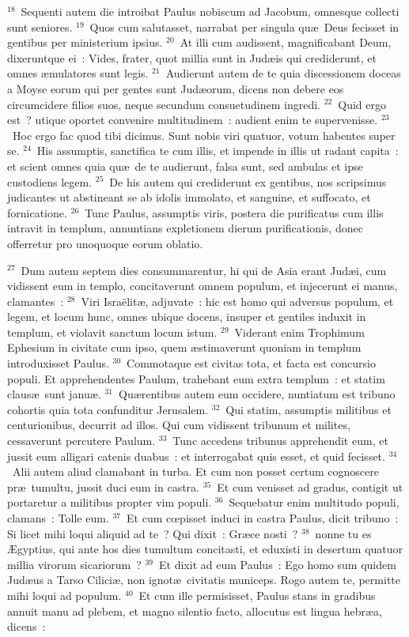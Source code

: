 ${}^{18}$~Sequenti autem die introibat Paulus nobiscum ad Jacobum, omnesque collecti sunt seniores.
${}^{19}$~Quos cum salutasset, narrabat per singula qu\ae\ Deus fecisset in gentibus per ministerium ipsius.
${}^{20}$~At illi cum audissent, magnificabant Deum, dixeruntque ei~: Vides, frater, quot millia sunt in Jud\ae is qui crediderunt, et omnes \ae mulatores sunt legis.
${}^{21}$~Audierunt autem de te quia discessionem doceas a Moyse eorum qui per gentes sunt Jud\ae orum, dicens non debere eos circumcidere filios suos, neque secundum consuetudinem ingredi.
${}^{22}$~Quid ergo est~? utique oportet convenire multitudinem~: audient enim te supervenisse.
${}^{23}$~Hoc ergo fac quod tibi dicimus. Sunt nobis viri quatuor, votum habentes super se.
${}^{24}$~His assumptis, sanctifica te cum illis, et impende in illis ut radant capita~: et scient omnes quia qu\ae\ de te audierunt, falsa sunt, sed ambulas et ipse custodiens legem.
${}^{25}$~De his autem qui crediderunt ex gentibus, nos scripsimus judicantes ut abstineant se ab idolis immolato, et sanguine, et suffocato, et fornicatione.
${}^{26}$~Tunc Paulus, assumptis viris, postera die purificatus cum illis intravit in templum, annuntians expletionem dierum purificationis, donec offerretur pro unoquoque eorum oblatio.


${}^{27}$~Dum autem septem dies consummarentur, hi qui de Asia erant Jud\ae i, cum vidissent eum in templo, concitaverunt omnem populum, et injecerunt ei manus, clamantes~:
${}^{28}$~Viri Isra\"elit\ae , adjuvate~: hic est homo qui adversus populum, et legem, et locum hunc, omnes ubique docens, insuper et gentiles induxit in templum, et violavit sanctum locum istum.
${}^{29}$~Viderant enim Trophimum Ephesium in civitate cum ipso, quem \ae stimaverunt quoniam in templum introduxisset Paulus.
${}^{30}$~Commotaque est civitas tota, et facta est concursio populi. Et apprehendentes Paulum, trahebant eum extra templum~: et statim claus\ae\ sunt janu\ae .
${}^{31}$~Qu\ae rentibus autem eum occidere, nuntiatum est tribuno cohortis quia tota confunditur Jerusalem.
${}^{32}$~Qui statim, assumptis militibus et centurionibus, decurrit ad illos. Qui cum vidissent tribunum et milites, cessaverunt percutere Paulum.
${}^{33}$~Tunc accedens tribunus apprehendit eum, et jussit eum alligari catenis duabus~: et interrogabat quis esset, et quid fecisset.
${}^{34}$~Alii autem aliud clamabant in turba. Et cum non posset certum cognoscere pr\ae\ tumultu, jussit duci eum in castra.
${}^{35}$~Et cum venisset ad gradus, contigit ut portaretur a militibus propter vim populi.
${}^{36}$~Sequebatur enim multitudo populi, clamans~: Tolle eum.
${}^{37}$~Et cum cœpisset induci in castra Paulus, dicit tribuno~: Si licet mihi loqui aliquid ad te~? Qui dixit~: Gr\ae ce nosti~?
${}^{38}$~nonne tu es \AE gyptius, qui ante hos dies tumultum concitasti, et eduxisti in desertum quatuor millia virorum sicariorum~?
${}^{39}$~Et dixit ad eum Paulus~: Ego homo sum quidem Jud\ae us a Tarso Cilici\ae , non ignot\ae\ civitatis municeps. Rogo autem te, permitte mihi loqui ad populum.
${}^{40}$~Et cum ille permisisset, Paulus stans in gradibus annuit manu ad plebem, et magno silentio facto, allocutus est lingua hebr\ae a, dicens~:

